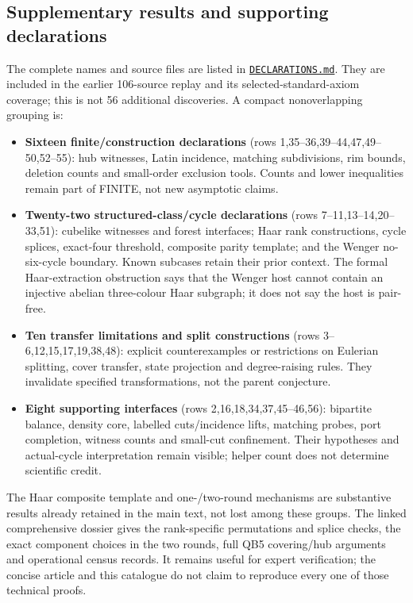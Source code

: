 \documentclass[smallextended]{svjour3}
\providecommand{\tightlist}{%
  \setlength{\itemsep}{0pt}\setlength{\parskip}{0pt}}
\begin{document}
\subsection{Supplementary results and supporting
declarations}\label{supplementary-results-and-supporting-declarations}

The complete names and source files are listed in
\href{https://github.com/roberthuynh/erdos-585/blob/1efc324e155ef0b6a7081c5f695c6c825e7debef/findings/supplement/lean/DECLARATIONS.md}{\texttt{DECLARATIONS.md}}.
They are included in the earlier 106-source replay and its
selected-standard-axiom coverage; this is not 56 additional discoveries.
A compact nonoverlapping grouping is:

\begin{itemize}
\tightlist
\item
  \textbf{Sixteen finite/construction declarations} (rows
  1,35--36,39--44,47,49--50,52--55): hub witnesses, Latin incidence,
  matching subdivisions, rim bounds, deletion counts and small-order
  exclusion tools. Counts and lower inequalities remain part of FINITE,
  not new asymptotic claims.
\item
  \textbf{Twenty-two structured-class/cycle declarations} (rows
  7--11,13--14,20--33,51): cubelike witnesses and forest interfaces;
  Haar rank constructions, cycle splices, exact-four threshold,
  composite parity template; and the Wenger no-six-cycle boundary. Known
  subcases retain their prior context. The formal Haar-extraction
  obstruction says that the Wenger host cannot contain an injective
  abelian three-colour Haar subgraph; it does not say the host is
  pair-free.
\item
  \textbf{Ten transfer limitations and split constructions} (rows
  3--6,12,15,17,19,38,48): explicit counterexamples or restrictions on
  Eulerian splitting, cover transfer, state projection and
  degree-raising rules. They invalidate specified transformations, not
  the parent conjecture.
\item
  \textbf{Eight supporting interfaces} (rows 2,16,18,34,37,45--46,56):
  bipartite balance, density core, labelled cuts/incidence lifts,
  matching probes, port completion, witness counts and small-cut
  confinement. Their hypotheses and actual-cycle interpretation remain
  visible; helper count does not determine scientific credit.
\end{itemize}

The Haar composite template and one-/two-round mechanisms are
substantive results already retained in the main text, not lost among
these groups. The linked comprehensive dossier gives the rank-specific
permutations and splice checks, the exact component choices in the two
rounds, full QB5 covering/hub arguments and operational census records.
It remains useful for expert verification; the concise article and this
catalogue do not claim to reproduce every one of those technical proofs.
\end{document}
